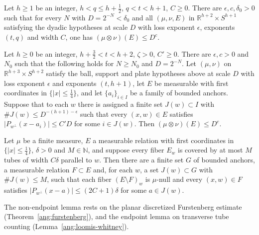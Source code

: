 \begin{lemma}\label{lg:nonendpoint}
Let $h\ge1$ be an integer, $h<q\le h+\frac12$, $q<t<h+1$, $C\ge0$. There are $\epsilon,c,\delta_0>0$ such that for every $N$ with $D=2^{-N}<\delta_0$ and all $(\mu,\nu,E)$ in $\mathbb R^{h+2}\times S^{h+1}$ satisfying the dyadic hypotheses at scale $D$ with loss exponent $\epsilon$, exponents $(t,q)$ and width $C$, one has $(\mu\otimes\nu)(E)\le D^{c}$.
\end{lemma}

\begin{lemma}\label{lg:angular}
Let $h\ge0$ be an integer, $h+\frac32<t<h+2$, $\zeta>0$, $C'\ge0$. There are $\epsilon,c>0$ and $N_0$ such that the following holds for $N\ge N_0$ and $D=2^{-N}$. Let $(\mu,\nu)$ on $\mathbb R^{h+3}\times S^{h+2}$ satisfy the ball, support and plate hypotheses above at scale $D$ with loss exponent $\epsilon$ and exponents $(t,h+1)$, let $E$ be measurable with first coordinates in $\{|x|\le\frac14\}$, and let $\{a_i\}_{i\in I}$ be a family of bounded anchors. Suppose that to each $w$ there is assigned a finite set $J(w)\subset I$ with $\#J(w)\le D^{-(h+1)-\epsilon}$ such that every $(x,w)\in E$ satisfies $|P_{w^\perp}(x-a_i)|\le C'D$ for some $i\in J(w)$. Then $(\mu\otimes\nu)(E)\le D^c$.
\end{lemma}

\begin{lemma}\label{lg:prepare}
Let $\mu$ be a finite measure, $E$ a measurable relation with first coordinates in $\{|x|\le\frac14\}$, $\delta>0$ and $M\in\mathbb N$, and suppose every fiber $E_w$ is covered by at most $M$ tubes of width $C\delta$ parallel to $w$. Then there are a finite set $G$ of bounded anchors, a measurable relation $F\subset E$ and, for each $w$, a set $J(w)\subset G$ with $\#J(w)\le M$, such that each fiber $(E\setminus F)_w$ is $\mu$-null and every $(x,w)\in F$ satisfies $|P_{w^\perp}(x-a)|\le (2C+1)\delta$ for some $a\in J(w)$.
\end{lemma}

The non-endpoint lemma rests on the planar discretized Furstenberg estimate (Theorem~\ref{ang:furstenberg}), and the endpoint lemma on transverse tube counting (Lemma~\ref{ang:loomis-whitney}).

